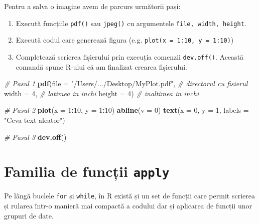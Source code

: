 \documentclass[]{article}
\newenvironment{Shaded}{\begin{snugshade}}{\end{snugshade}}
\newcommand{\KeywordTok}[1]{\textcolor[rgb]{0.13,0.29,0.53}{\textbf{#1}}}
\newcommand{\DataTypeTok}[1]{\textcolor[rgb]{0.13,0.29,0.53}{#1}}
\newcommand{\DecValTok}[1]{\textcolor[rgb]{0.00,0.00,0.81}{#1}}
\newcommand{\StringTok}[1]{\textcolor[rgb]{0.31,0.60,0.02}{#1}}
\newcommand{\CommentTok}[1]{\textcolor[rgb]{0.56,0.35,0.01}{\textit{#1}}}
\newcommand{\OperatorTok}[1]{\textcolor[rgb]{0.81,0.36,0.00}{\textbf{#1}}}
\newcommand{\NormalTok}[1]{#1}
\providecommand{\tightlist}{%
  \setlength{\itemsep}{0pt}\setlength{\parskip}{0pt}}
\newcounter{exo}[section]
\begin{document}
Pentru a salva o imagine avem de parcurs următorii pași:

\begin{enumerate}
\def\labelenumi{\arabic{enumi}.}
\tightlist
\item
  Execută funcțiile \texttt{pdf()} sau \texttt{jpeg()} cu argumentele
  \texttt{file,\ width,\ height}.
\item
  Execută codul care generează figura (e.g.
  \texttt{plot(x\ =\ 1:10,\ y\ =\ 1:10)})
\item
  Completează scrierea fișierului prin execuția comenzii
  \texttt{dev.off()}. Această comandă spune R-ului că am finalizat
  crearea fișierului.
\end{enumerate}

\begin{Shaded}
\begin{Highlighting}[]
\CommentTok{# Pasul 1}
\KeywordTok{pdf}\NormalTok{(}\DataTypeTok{file =} \StringTok{"/Users/.../Desktop/MyPlot.pdf"}\NormalTok{,   }\CommentTok{# directorul cu fisierul }
    \DataTypeTok{width =} \DecValTok{4}\NormalTok{, }\CommentTok{# latimea in inchi}
    \DataTypeTok{height =} \DecValTok{4}\NormalTok{) }\CommentTok{# inaltimea in inchi}

\CommentTok{# Pasul 2}
\KeywordTok{plot}\NormalTok{(}\DataTypeTok{x =} \DecValTok{1}\OperatorTok{:}\DecValTok{10}\NormalTok{, }
     \DataTypeTok{y =} \DecValTok{1}\OperatorTok{:}\DecValTok{10}\NormalTok{)}
\KeywordTok{abline}\NormalTok{(}\DataTypeTok{v =} \DecValTok{0}\NormalTok{) }
\KeywordTok{text}\NormalTok{(}\DataTypeTok{x =} \DecValTok{0}\NormalTok{, }\DataTypeTok{y =} \DecValTok{1}\NormalTok{, }\DataTypeTok{labels =} \StringTok{"Ceva text aleator"}\NormalTok{)}

\CommentTok{# Pasul 3}
\KeywordTok{dev.off}\NormalTok{()}
\end{Highlighting}
\end{Shaded}

\section{\texorpdfstring{Familia de funcții
\texttt{apply}}{Familia de funcții apply}}\label{familia-de-functii-apply}

Pe lângă buclele \texttt{for} și \texttt{while}, în R există și un set
de funcții care permit scrierea și rularea într-o manieră mai compactă a
codului dar și aplicarea de funcții unor grupuri de date.
\end{document}
